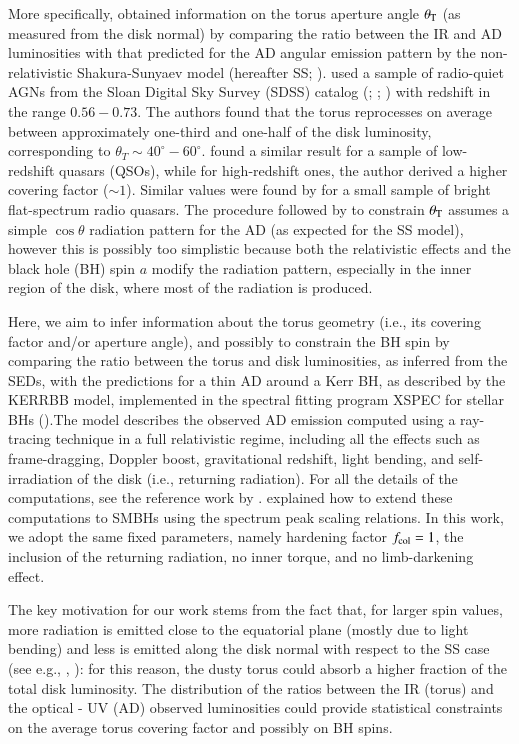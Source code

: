 \documentclass[]{aa}
\begin{document}
More specifically, \citet{Caldero12} obtained information on the torus aperture angle $\theta_{\rm T}$ (as measured from the disk normal) by comparing the ratio between the IR and AD luminosities with that predicted for the AD angular emission pattern by the non-relativistic Shakura-Sunyaev model (hereafter SS; \citealt{SS}). \citet{Caldero12} used a sample of radio-quiet AGNs from the Sloan Digital Sky Survey (SDSS) catalog (\citealt{York}; \citealt{Schnei}; \citealt{Shenetal11}) with redshift in the range $0.56-0.73$. The authors found that the torus reprocesses on average between approximately one-third and one-half of the disk luminosity, corresponding to $\theta_T \sim 40^{\circ}-60^{\circ}$. \citet{Gu} found a similar result for a sample of low-redshift quasars (QSOs), while for high-redshift ones, the author derived a higher covering factor ($\sim 1$). Similar values were found by \citet{CastiDe} for a small sample of bright flat-spectrum radio quasars. The procedure followed by \citet{Caldero12} to constrain $\theta_{\rm T}$ assumes a simple $\cos \theta$ radiation pattern for the AD (as expected for the SS model), however this is possibly too simplistic because both the relativistic effects and the black hole (BH) spin $a$ modify the radiation pattern, especially in the inner region of the disk, where most of the radiation is produced. 

Here, we aim to infer information about the torus geometry (i.e., its covering factor and/or aperture angle), and possibly to constrain the BH spin by comparing the ratio between the torus and disk luminosities, as inferred from the SEDs, with the predictions for a thin AD around a Kerr BH, as described by the KERRBB model, implemented in the spectral fitting program XSPEC for stellar BHs (\citealt{ArnaudXPS}).The model describes the observed AD emission computed using a ray-tracing technique in a full relativistic regime, including all the effects such as frame-dragging, Doppler boost, gravitational redshift, light bending, and self-irradiation of the disk (i.e., returning radiation). For all the details of the computations, see the reference work by \citet{Lietal}. \citet{Campiti} explained how to extend these computations to SMBHs using the spectrum peak scaling relations. In this work, we adopt the same fixed parameters, namely hardening factor $f_{\rm col} = 1$, the inclusion of the returning radiation, no inner torque, and no limb-darkening effect.

The key motivation for our work stems from the fact that, for larger spin values, more radiation is emitted close to the equatorial plane (mostly due to light bending) and less is emitted along the disk normal with respect to the SS case (see e.g., \citealt{Campiti}, \citealt{Ishi}): for this reason, the dusty torus could absorb a higher fraction of the total disk luminosity. The distribution of the ratios between the IR (torus) and the optical - UV (AD) observed luminosities could provide statistical constraints on the average torus covering factor and possibly on BH spins.
\end{document}
